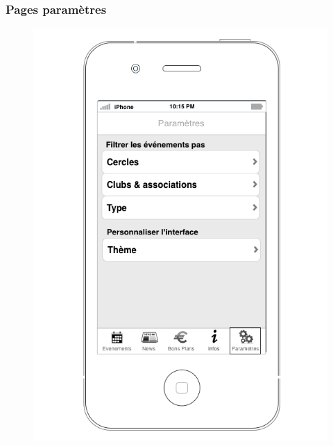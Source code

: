 \documentclass[a4paper, 11px]{article}
\begin{document}
\subsubsection{Pages paramètres}
\begin{figure}[htbp]
	\begin{minipage}[c]{.50\linewidth}
		\begin{center}
			\includegraphics[scale=0.3]{../../Sketch/iOS/parametres.png}
		\end{center}
	\end{minipage}
	\hfill
	\begin{minipage}[c]{.50\linewidth}
		\begin{center}

\end{center}
\end{minipage}
\end{figure}
\end{document}
